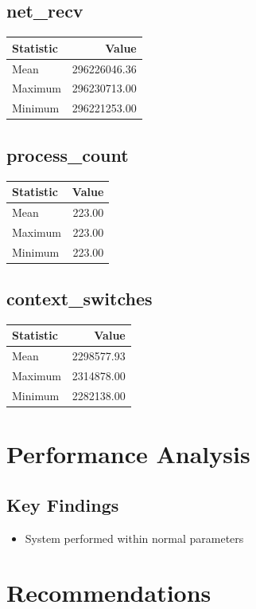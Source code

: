 \documentclass[11pt]{article}
\begin{document}
\subsection{net_recv}
\begin{tabular}{lr}
\toprule
Statistic & Value \\
\midrule
Mean & 296226046.36 \\
Maximum & 296230713.00 \\
Minimum & 296221253.00 \\
\bottomrule
\end{tabular}


\subsection{process_count}
\begin{tabular}{lr}
\toprule
Statistic & Value \\
\midrule
Mean & 223.00 \\
Maximum & 223.00 \\
Minimum & 223.00 \\
\bottomrule
\end{tabular}


\subsection{context_switches}
\begin{tabular}{lr}
\toprule
Statistic & Value \\
\midrule
Mean & 2298577.93 \\
Maximum & 2314878.00 \\
Minimum & 2282138.00 \\
\bottomrule
\end{tabular}


\section{Performance Analysis}
\subsection{Key Findings}
\begin{itemize}
\item System performed within normal parameters
\end{itemize}

\section{Recommendations}
\begin{itemize}

\end{itemize}
\end{document}
